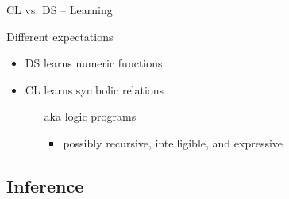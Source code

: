 \documentclass[presentation]{beamer}\mode<presentation>{\usetheme{AMSBolognaFC}}
\begin{document}
\begin{frame}[allowframebreaks]{CL vs. DS -- Learning}
    \begin{block}{Different expectations}
        \begin{itemize}
            \item DS learns numeric functions
            \item CL learns symbolic relations
            \begin{itemize}
                \item[aka] logic programs 
                \begin{itemize}
                    \item possibly recursive, intelligible, and expressive
                \end{itemize}
            \end{itemize}
        \end{itemize}
    \end{block}
\end{frame}

\subsection{Inference}
\end{document}

